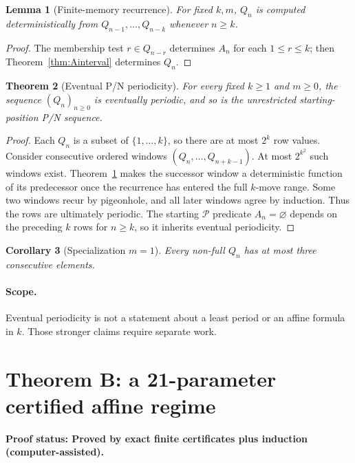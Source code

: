 \documentclass[11pt]{article}
\newtheorem{theorem}{Theorem}[section]
\newtheorem{lemma}[theorem]{Lemma}
\newtheorem{corollary}[theorem]{Corollary}
\theoremstyle{remark}
\newcommand{\Pset}{\mathcal{P}}
\newcommand{\statusmachine}{\textbf{Proof status: Proved by exact finite certificates plus induction (computer-assisted).}}
\begin{document}
\begin{lemma}[Finite-memory recurrence]\label{lem:memory}
For fixed $k,m$, $Q_n$ is computed deterministically from $Q_{n-1},\ldots,Q_{n-k}$ whenever $n\ge k$.
\end{lemma}
\begin{proof}The membership test $r\in Q_{n-r}$ determines $A_n$ for each $1\le r\le k$; then Theorem~\ref{thm:Ainterval} determines $Q_n$.\end{proof}

\begin{theorem}[Eventual P/N periodicity]\label{thm:Aperiod}
For every fixed $k\ge1$ and $m\ge0$, the sequence $(Q_n)_{n\ge0}$ is eventually periodic, and so is the unrestricted starting-position P/N sequence.
\end{theorem}
\begin{proof}
Each $Q_n$ is a subset of $\{1,\ldots,k\}$, so there are at most $2^k$ row values. Consider consecutive ordered windows $(Q_n,\ldots,Q_{n+k-1})$. At most $2^{k^2}$ such windows exist. Theorem~\ref{lem:memory} makes the successor window a deterministic function of its predecessor once the recurrence has entered the full $k$-move range. Some two windows recur by pigeonhole, and all later windows agree by induction. Thus the rows are ultimately periodic. The starting $\Pset$ predicate $A_n=\varnothing$ depends on the preceding $k$ rows for $n\ge k$, so it inherits eventual periodicity.
\end{proof}
\begin{corollary}[Specialization $m=1$] Every non-full $Q_n$ has at most three consecutive elements.\end{corollary}
\paragraph{Scope.} Eventual periodicity is not a statement about a least period or an affine formula in $k$. Those stronger claims require separate work.

\section{Theorem B: a 21-parameter certified affine regime}\label{sec:B}
\statusmachine
\end{document}
